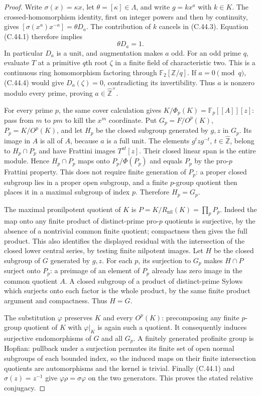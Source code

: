 \begin{proof}
Write $\sigma(x)=\kappa x$, let $\theta=[\kappa]\in\Lambda$,
and write $g=kx^a$ with $k\in K$. The crossed-homomorphism identity,
first on integer powers and then by continuity, gives
$[\sigma(x^a)x^{-a}]=\theta D_a$.
The contribution of $k$ cancels in (C.44.3). Equation (C.44.1)
therefore implies
\[
                           \theta D_a=1.                    \tag{C.44.5}
\]
In particular $D_a$ is a unit, and augmentation makes $a$ odd.
For an odd prime $q$, evaluate $T$ at a primitive $q$th root
$\zeta$ in a finite field of characteristic two. This is a
continuous ring homomorphism factoring through
$\mathbb F_2[\mathbb Z/q]$. If $a=0\pmod q$, (C.44.4) would
give $D_a(\zeta)=0$, contradicting its invertibility. Thus $a$
is nonzero modulo every prime, proving
$a\in\widehat{\mathbb Z}^{\times}$.

For every prime $p$, the same cover calculation gives
$K/\Phi_p(K)=\mathbb F_p[[A]][z]$: pass from $m$ to $pm$ to
kill the $x^m$ coordinate. Put $G_p=F/O^p(K)$,
$P_p=K/O^p(K)$, and let $H_p$ be the closed subgroup generated by
$g,z$ in $G_p$. Its image in $A$ is all of $A$, because $a$ is a
full unit. The elements $g^t z g^{-t}$,
$t\in\widehat{\mathbb Z}$, belong to $H_p\cap P_p$ and have
Frattini images $T^{at}[z]$. Their closed linear span is the
entire module. Hence $H_p\cap P_p$ maps onto $P_p/\Phi(P_p)$
and equals $P_p$ by the pro-$p$ Frattini property. This does not
require finite generation of $P_p$: a proper closed subgroup lies
in a proper open subgroup, and a finite $p$-group quotient then
places it in a maximal subgroup of index $p$. Therefore $H_p=G_p$.

The maximal pronilpotent quotient of $K$ is
$P=K/R_{\mathrm{nil}}(K)=\prod_pP_p$. Indeed the map onto any
finite product of distinct-prime pro-$p$ quotients is surjective,
by the absence of a nontrivial common finite quotient; compactness
then gives the full product. This also identifies the displayed
residual with the intersection of the closed lower central series,
by testing finite nilpotent images. Let $H$ be the closed subgroup
of $G$ generated by $g,z$. For each $p$, its surjection to $G_p$
makes $H\cap P$ surject onto $P_p$: a preimage of an element of
$P_p$ already has zero image in the common quotient $A$.
A closed subgroup of a product of distinct-prime Sylows which
surjects onto each factor is the whole product, by the same finite
product argument and compactness. Thus $H=G$.

The substitution $\varphi$ preserves $K$ and every $O^p(K)$:
precomposing any finite $p$-group quotient of $K$ with
$\varphi|_K$ is again such a quotient. It consequently induces
surjective endomorphisms of $G$ and all $G_p$. A finitely generated
profinite group is Hopfian: pullback under a surjection permutes
its finite set of open normal subgroups of each bounded index,
so the induced maps on their finite intersection quotients are
automorphisms and the kernel is trivial.
Finally (C.44.1) and $\sigma(z)=z^{-1}$ give
$\varphi\rho=\sigma\varphi$ on the two generators. This proves
the stated relative conjugacy.
\end{proof}
